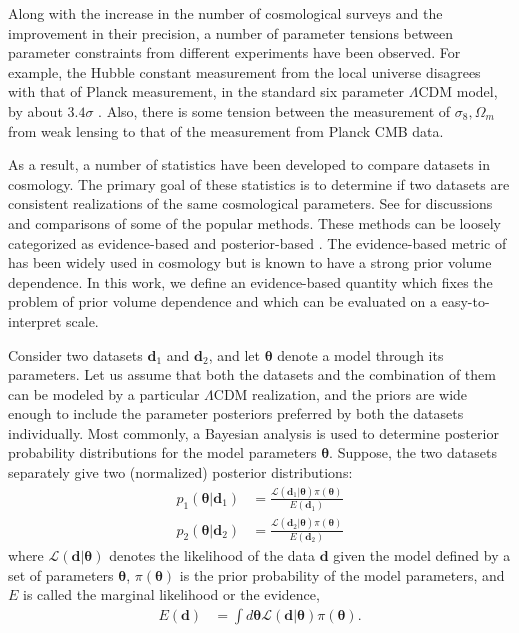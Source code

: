 \documentclass[amsmath, prd, reprint, aps]{revtex4-1}
\newcommand{\dv}{\textbf{d}}
\newcommand{\tv}{\bm{\theta}}
\begin{document}
Along with the increase in the number of cosmological surveys and the improvement in their precision, a number of parameter tensions between parameter constraints from different experiments have been observed. For example, the Hubble constant measurement from the local universe disagrees with that of Planck measurement, in the standard six parameter $\Lambda$CDM model, by about $3.4\sigma$ \cite{Riess:2016jrr, Bernal:2016gxb}. Also, there is some tension between the measurement of $\sigma_8, \Omega_m$ from weak lensing to that of the measurement from Planck CMB data. 

As a result, a number of statistics have been developed to compare datasets in cosmology. The primary goal of these statistics is to determine if two datasets are consistent realizations of the same cosmological parameters. See \cite{Seehars:2015qza, Charnock:2017vcd, Lin:2017ikq} for discussions and comparisons of some of the popular methods. These methods can be loosely categorized as evidence-based \cite{Marshall:2004zd} and posterior-based \cite{Seehars:2014ora}. The evidence-based metric of \cite{Marshall:2004zd} has been widely used in cosmology \cite{March:2011rv, Amendola:2012wc, Joudaki:2016mvz, Raveri:2015maa} but is known to have a strong prior volume dependence. In this work, we define an evidence-based quantity which fixes the problem of prior volume dependence and which can be evaluated on a easy-to-interpret scale.

Consider two datasets $\dv_1$ and $\dv_2$, and let $\tv$ denote a model through its parameters. Let us assume that both the datasets and the combination of them can be modeled by a particular $\Lambda$CDM realization, and the priors are wide enough to include the parameter posteriors preferred by both the datasets individually. Most commonly, a Bayesian analysis is used to determine posterior probability distributions for the model parameters $\tv$. Suppose, the two datasets separately give two (normalized) posterior distributions:
\begin{align}
    p_1(\tv | \dv_1) &= \frac{ \mathcal{L}(\dv_1|\tv) \pi(\tv)}{E(\dv_1)}
    \label{eq:p1} \\
    p_2(\tv | \dv_2) &= \frac{\mathcal{L}(\dv_2|\tv) \pi(\tv)}{E(\dv_2)}
    \label{eq:p2}
\end{align}
where $\mathcal{L}(\dv|\tv)$ denotes the likelihood of the data $\dv$ given the model defined by a set of parameters $\tv$, $\pi(\tv)$ is the prior probability of the model parameters, and $E$ is called the marginal likelihood or the evidence,
\begin{align}
    E(\dv) &= \int d\tv \mathcal{L}(\dv|\tv) \pi(\tv).
    \label{eq:evidence}
\end{align}
\end{document}
